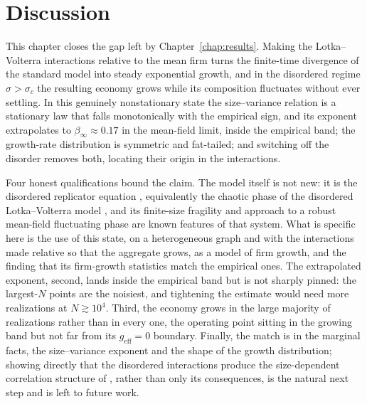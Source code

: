 \section{Discussion}
\label{sec:growing-discussion}

This chapter closes the gap left by Chapter~\ref{chap:results}. Making the
Lotka--Volterra interactions relative to the mean firm turns the finite-time divergence
of the standard model into steady exponential growth, and in the disordered regime
$\sigma > \sigma_c$ the resulting economy grows while its composition fluctuates without
ever settling. In this genuinely nonstationary state the size--variance relation is a
stationary law that falls monotonically with the empirical sign, and its exponent
extrapolates to $\beta_\infty \approx 0.17$ in the mean-field limit, inside the empirical
band; the growth-rate distribution is symmetric and fat-tailed; and switching off
the disorder removes both, locating their origin in the interactions.

Four honest qualifications bound the claim. The model itself is not new: it is the
disordered replicator equation \citep{diederich1989,hofbauer81}, equivalently the
chaotic phase of the disordered Lotka--Volterra model \citep{bunin2017,galla2018,roy2020},
and its finite-size fragility and approach to a robust mean-field fluctuating phase are
known features of that system. What is specific here is the use of this state, on a
heterogeneous graph and with the interactions made relative so that the aggregate grows,
as a model of firm growth, and the finding that its firm-growth statistics match the
empirical ones. The extrapolated exponent, second, lands inside the empirical band but is
not sharply pinned: the largest-$N$ points are the noisiest, and tightening the estimate
would need more realizations at $N \gtrsim 10^4$. Third, the economy grows in the large
majority of realizations rather than in every one, the operating point sitting in the
growing band but not far from its $g_{\mathrm{eff}} = 0$ boundary. Finally, the match is in the marginal facts, the size--variance exponent and
the shape of the growth distribution; showing directly that the disordered interactions
produce the size-dependent correlation structure of \citet{moran2024}, rather than only
its consequences, is the natural next step and is left to future work.
